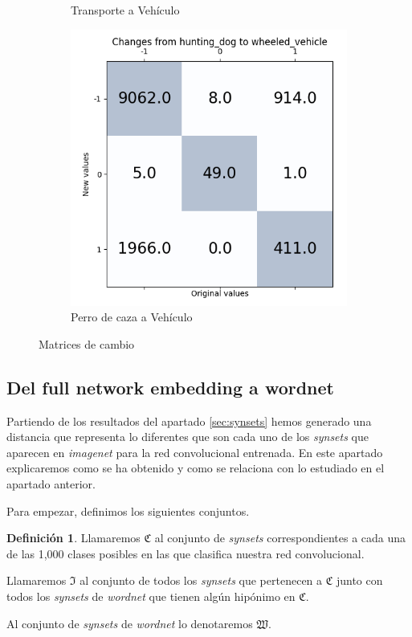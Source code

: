 \documentclass[12,twoside]{TFG-GM}
\theoremstyle{definition}
\newtheorem{definition}[theorem]{Definición}
\theoremstyle{remark}
\begin{document}
\begin{figure}[ht]
\begin{subfigure}[b]{0.3\textwidth}
		\caption{Transporte a Vehículo \label{fig:matrixConveyanceWheel}}
	\end{subfigure}
	\begin{subfigure}[b]{0.3\textwidth}
		\includegraphics[width=\textwidth]  {Images/plots/25/matrices/matrixhuntingwheel.png}
		\caption{Perro de caza a Vehículo\label{fig:MatrixWheelHunt}}
	\end{subfigure}       
	\caption{Matrices de cambio\label{fig:matrixconcret}}
\end{figure}


\subsection{Del full network embedding a wordnet}


Partiendo de los resultados del apartado \ref{sec:synsets} hemos generado una distancia que representa lo diferentes que son cada uno de los \textit{synsets} que aparecen en \textit{imagenet} para la red convolucional entrenada. En este apartado explicaremos como se ha obtenido y como se relaciona con lo estudiado en el apartado anterior. 

Para empezar, definimos los siguientes conjuntos.
\begin{definition}
Llamaremos $\mathfrak{C}$ al conjunto de \textit{synsets} correspondientes a cada una de las  1,000 clases posibles en las que clasifica nuestra red convolucional.  

Llamaremos $\mathfrak{I}$ al conjunto de todos los \textit{synsets} que pertenecen a $\mathfrak{C}$ junto con todos los \textit{synsets} de \textit{wordnet} que tienen algún hipónimo en $\mathfrak{C}$. 

Al conjunto de \textit{synsets} de \textit{wordnet} lo denotaremos $\mathfrak{W}$. 
\end{definition}
\end{document}
